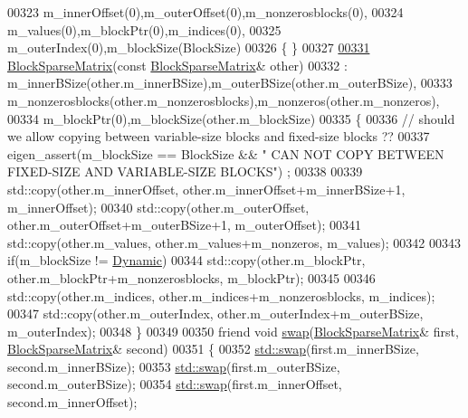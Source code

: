 \begin{DoxyCode}
00323         m\_innerOffset(0),m\_outerOffset(0),m\_nonzerosblocks(0),
00324         m\_values(0),m\_blockPtr(0),m\_indices(0),
00325         m\_outerIndex(0),m\_blockSize(BlockSize)
00326     \{ \}
00327 
\hyperlink{group___sparse_core___module_a5d0b6ea10540a0968410daf3b1ff99e8}{00331}     \hyperlink{group___sparse_core___module_a5d0b6ea10540a0968410daf3b1ff99e8}{BlockSparseMatrix}(\textcolor{keyword}{const} \hyperlink{group___sparse_core___module_class_eigen_1_1_block_sparse_matrix}{BlockSparseMatrix}& other)
00332       : m\_innerBSize(other.m\_innerBSize),m\_outerBSize(other.m\_outerBSize),
00333         m\_nonzerosblocks(other.m\_nonzerosblocks),m\_nonzeros(other.m\_nonzeros),
00334         m\_blockPtr(0),m\_blockSize(other.m\_blockSize)
00335     \{
00336       \textcolor{comment}{// should we allow copying between variable-size blocks and fixed-size blocks ??}
00337       eigen\_assert(m\_blockSize == BlockSize && \textcolor{stringliteral}{" CAN NOT COPY BETWEEN FIXED-SIZE AND VARIABLE-SIZE BLOCKS"})
      ;
00338 
00339       std::copy(other.m\_innerOffset, other.m\_innerOffset+m\_innerBSize+1, m\_innerOffset);
00340       std::copy(other.m\_outerOffset, other.m\_outerOffset+m\_outerBSize+1, m\_outerOffset);
00341       std::copy(other.m\_values, other.m\_values+m\_nonzeros, m\_values);
00342 
00343       \textcolor{keywordflow}{if}(m\_blockSize != \hyperlink{namespace_eigen_ad81fa7195215a0ce30017dfac309f0b2}{Dynamic})
00344         std::copy(other.m\_blockPtr, other.m\_blockPtr+m\_nonzerosblocks, m\_blockPtr);
00345 
00346       std::copy(other.m\_indices, other.m\_indices+m\_nonzerosblocks, m\_indices);
00347       std::copy(other.m\_outerIndex, other.m\_outerIndex+m\_outerBSize, m\_outerIndex);
00348     \}
00349 
00350     \textcolor{keyword}{friend} \textcolor{keywordtype}{void} \hyperlink{endian_8c_a3ca5ecd34b04d6a243c054ac3a57f68d}{swap}(\hyperlink{group___sparse_core___module_class_eigen_1_1_block_sparse_matrix}{BlockSparseMatrix}& first, 
      \hyperlink{group___sparse_core___module_class_eigen_1_1_block_sparse_matrix}{BlockSparseMatrix}& second)
00351     \{
00352       \hyperlink{endian_8c_a3ca5ecd34b04d6a243c054ac3a57f68d}{std::swap}(first.m\_innerBSize, second.m\_innerBSize);
00353       \hyperlink{endian_8c_a3ca5ecd34b04d6a243c054ac3a57f68d}{std::swap}(first.m\_outerBSize, second.m\_outerBSize);
00354       \hyperlink{endian_8c_a3ca5ecd34b04d6a243c054ac3a57f68d}{std::swap}(first.m\_innerOffset, second.m\_innerOffset);

\end{DoxyCode}
